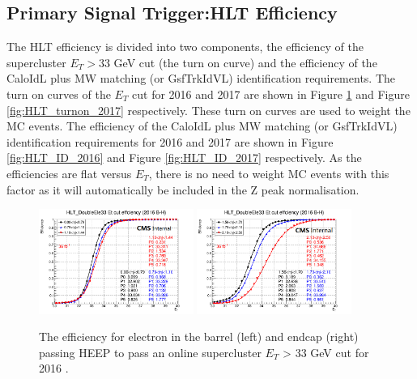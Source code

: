\subsection{Primary Signal Trigger:HLT Efficiency}\label{sec:HLT_efficiency}
The HLT efficiency is divided into two components, the efficiency of the supercluster $E_{T}>33$ GeV cut (the turn on curve) and the efficiency of the CaloIdL plus MW matching (or GsfTrkIdVL) identification requirements. The turn on curves of the $E_{T}$ cut for 2016 and 2017 are shown in Figure \ref{fig:HLT_turnon_2016} and Figure \ref{fig:HLT_turnon_2017} respectively. These turn on curves are used to weight the MC events.
The efficiency of the CaloIdL plus MW matching (or GsfTrkIdVL) identification requirements for 2016 and 2017 are shown in Figure \ref{fig:HLT_ID_2016} and Figure \ref{fig:HLT_ID_2017} respectively. As the efficiencies are flat versus $E_{T}$, there is no need to weight MC events with this factor as it will automatically be included in the Z peak normalisation.

\begin{figure}[h!]
\begin{center}
\includegraphics[width=0.45\textwidth]{figures/Zprime/2016/trigger/turnOnEEUnseeded.png}
\includegraphics[width=0.45\textwidth]{figures/Zprime/2016/trigger/turnOnEBUnseeded.png}
\caption{The efficiency for electron in the barrel (left) and endcap (right) passing HEEP to pass an online supercluster $E_{T}$ > 33 GeV cut for 2016 \cite{CMS-AN-2016-404}.}
\label{fig:HLT_turnon_2016}
\end{center}
\end{figure}

